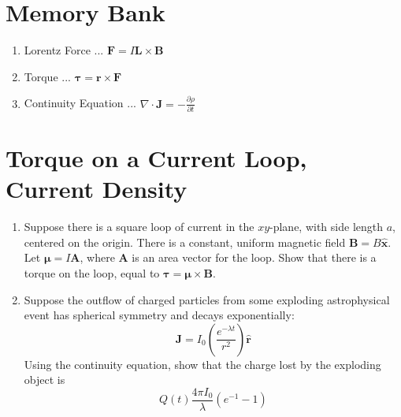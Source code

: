 \documentclass[12pt]{article}
\begin{document}
\maketitle
\small
\section{Memory Bank}
\begin{enumerate}
\item Lorentz Force ... $\mathbf{F} = I \mathbf{L} \times \mathbf{B}$
\item Torque ... $\boldsymbol\tau = \mathbf{r} \times \mathbf{F}$
\item Continuity Equation ... $\nabla \cdot \mathbf{J} = -\frac{\partial \rho}{\partial t}$
\end{enumerate}

\section{Torque on a Current Loop, Current Density}

\begin{enumerate}
\item Suppose there is a square loop of current in the $xy$-plane, with side length $a$, centered on the origin.  There is a constant, uniform magnetic field $\mathbf{B} = B \hat{\mathbf{x}}$.  Let $\boldsymbol\mu = I \mathbf{A}$, where $\mathbf{A}$ is an area vector for the loop.  Show that there is a torque on the loop, equal to $\boldsymbol\tau = \boldsymbol\mu \times \mathbf{B}$. \\ \vspace{5cm}
\item Suppose the outflow of charged particles from some exploding astrophysical event has spherical symmetry and decays exponentially:
\begin{equation}
\mathbf{J} = I_0 \left(\frac{e^{-\lambda t}}{r^2}\right)\hat{\mathbf{r}}
\end{equation}
Using the continuity equation, show that the charge lost by the exploding object is 
\begin{equation}
Q(t) \frac{4\pi I_0}{\lambda}\left(e^{-1} - 1\right)
\end{equation}
\end{enumerate}
\end{document}
